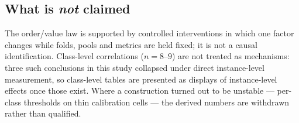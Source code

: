 \documentclass[journal]{IEEEtran}
\begin{document}
\subsection{What is \emph{not} claimed}
\label{sec:not-claimed}

The order/value law is supported by controlled interventions in which one factor changes while folds,
pools and metrics are held fixed; it is not a causal identification. Class-level correlations
($n = 8$--$9$) are not treated as mechanisms: three such conclusions in this study collapsed under
direct instance-level measurement, so class-level tables are presented as displays of instance-level
effects once those exist. Where a construction turned out to be unstable --- per-class thresholds on
thin calibration cells --- the derived numbers are withdrawn rather than qualified.
\end{document}
